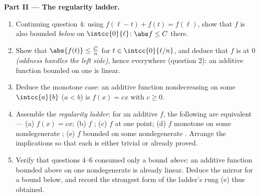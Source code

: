 \begin{problem}[{Weekend problem --- $f(x + y) = f(x) + f(y)$:
regularity forces linearity, and the portrait of the monsters}]
\medskip
\noindent\textbf{Part II --- The regularity ladder.}
\begin{enumerate}[resume]
  \item Continuing question 4: using $f(\ell - t) + f(t) =
        f(\ell)$, show that $f$ is also bounded \emph{below} on
        $\intcc{0}{\ell}$: $\abs f \leq C$ there.
  \item Show that $\abs{f(t)} \leq \frac{C}{n}$ for $t \in
        \intcc{0}{\ell/n}$, and deduce that $f$ is  at
        $0$ \emph{(oddness handles the left side)}, hence
        everywhere (question 2): an additive function bounded on
        one  is linear.
  \item Deduce the monotone case: an additive function
        nondecreasing on some $\intcc{a}{b}$ ($a < b$) is $f(x)
        = cx$ with $c \geq 0$.
  \item Assemble the \emph{regularity ladder}: for an additive
        $f$, the following are equivalent --- (a) $f(x) = cx$;
        (b) $f$ ; (c) $f$  at one point; (d)
        $f$ monotone on some nondegenerate ; (e) $f$
        bounded on some nondegenerate . Arrange the
        implications so that each is either trivial or already
        proved.
  \item Verify that questions 4--6 consumed only a bound
        \emph{above}: an additive function bounded above on one
        nondegenerate  is already linear. Deduce the
        mirror  for a bound below, and record the
        strongest form of the ladder's rung (e) thus obtained.
\end{enumerate}


\end{problem}
